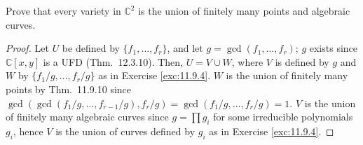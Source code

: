 \documentclass[12pt]{article}
\theoremstyle{remark}
\begin{document}
\begin{problem}
  Prove that every variety in $\mathbb{C}^2$ is the union of finitely many points and algebraic curves.
\end{problem}
\begin{proof}
  Let $U$ be defined by $\{f_1,\ldots,f_r\}$, and let $g = \gcd(f_1,\ldots,f_r)$; $g$ exists since $\mathbb{C}[x,y]$ is a UFD (Thm.~12.3.10). Then, $U = V \cup W$, where $V$ is defined by $g$ and $W$ by $\{f_1/g,\ldots,f_r/g\}$ as in Exercise \ref{exc:11.9.4}. $W$ is the union of finitely many points by Thm.~11.9.10 since $\gcd(\gcd(f_1/g,\ldots,f_{r-1}/g),f_r/g) = \gcd(f_1/g,\ldots,f_r/g) = 1$. $V$ is the union of finitely many algebraic curves since $g = \prod g_i$ for some irreducible polynomials $g_i$, hence $V$ is the union of curves defined by $g_i$ as in Exercise \ref{exc:11.9.4}.
\end{proof}
\end{document}
